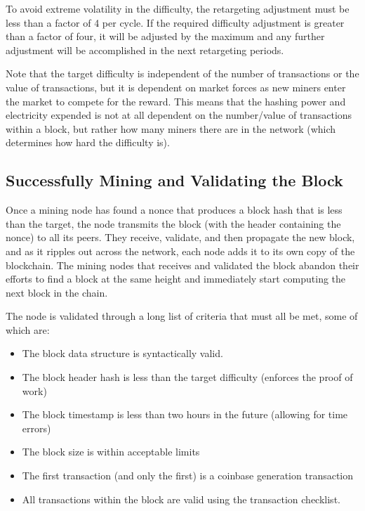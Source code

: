\documentclass{article}
\begin{document}
    To avoid extreme volatility in the difficulty, the retargeting adjustment must be less than a factor of 4 per cycle. If the required difficulty adjustment is greater than a factor of four, it will be adjusted by the maximum and any further adjustment will be accomplished in the next retargeting periods.

    Note that the target difficulty is independent of the number of transactions or the value of transactions, but it is dependent on market forces as new miners enter the market to compete for the reward.
    This means that the hashing power and electricity expended is not at all dependent on the number/value of transactions within a block, but rather how many miners there are in the network (which determines how hard the difficulty is).

  \subsection{Successfully Mining and Validating the Block}

    Once a mining node has found a nonce that produces a block hash that is less than the target, the node transmits the block (with the header containing the nonce) to all its peers. They receive, validate, and then propagate the new block, and as it ripples out across the network, each node adds it to its own copy of the blockchain. The mining nodes that receives and validated the block abandon their efforts to find a block at the same height and immediately start computing the next block in the chain.

    The node is validated through a long list of criteria that must all be met, some of which are:
    \begin{itemize}
      \item The block data structure is syntactically valid.
      \item The block header hash is less than the target difficulty (enforces the proof of work)
      \item The block timestamp is less than two hours in the future (allowing for time errors)
      \item The block size is within acceptable limits
      \item The first transaction (and only the first) is a coinbase generation transaction
      \item All transactions within the block are valid using the transaction checklist.
    \end{itemize}
\end{document}
